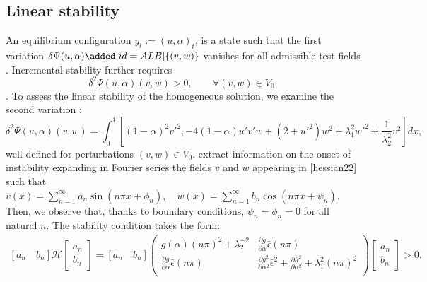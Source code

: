 
\subsection{Linear stability}
An equilibrium configuration $y_t:=(u,\alpha)_t$, is a state such that the first variation $\delta \Psi(u,\alpha)\added[id=ALB]{(v, w)}$ vanishes for all admissible test fields  . Incremental stability further requires
\begin{equation}
\delta^2 \Psi(u,\alpha)(v,w)>0, \qquad  \forall (v,w)\in V_0,
\label{eqn:linear_second_order_stability}
\end{equation}
. 
To assess the linear stability of the homogeneous solution, we examine the  second variation  :
\begin{equation}
\delta^2 \Psi(u,\alpha)(v,w)=\int_0^1 [(1-\alpha)^2v'^2 ,
- 4(1-\alpha)u' v'w+(2+ u'^2)w^2+\lambda_1^2w'^2 +\frac{1}{\lambda_2^2} v^2 ]dx,
\label{hessian22}
\end{equation}
well defined for perturbations $(v, w)\in V_0$.
 extract information on the onset of instability expanding in Fourier series the fields $v$ and $w$ appearing in \eqref{hessian22} such that $v(x)=\sum_{n=1}^{\infty} a_{n} \sin \left(n \pi x+\phi_{n}\right), \quad w(x)=\sum_{n=1}^{\infty} b_{n} \cos \left(n \pi x+\psi_{n}\right)$. Then, we observe that, thanks to boundary conditions, $\psi_{n}=\phi_{n}=0$ for all natural $n$. The stability condition  takes the form:
\begin{align}\left[ a_n \quad b_n \right] \mathcal{H} \left[ \begin{array}{c} a_n \\ b_n \end{array} \right]=\left[ a_n \quad b_n \right]\left(
\begin{array}{cc}
g(\alpha)(n\pi)^2+\lambda_2^{-2}  & \frac{\partial g}{\partial \alpha}\bar\epsilon(n\pi)  \\
\frac{\partial g}{\partial \alpha}\bar\epsilon(n\pi)  &   \frac{\partial g^2}{\partial \alpha^2}\bar\epsilon^2+ \frac{\partial h^2}{\partial \alpha^2}+\lambda_1^2(n\pi)^2  \\
\end{array}
\right)\left[ \begin{array}{c} a_n \\ b_n \end{array} \right]>0.\label{hessian1}\end{align}
